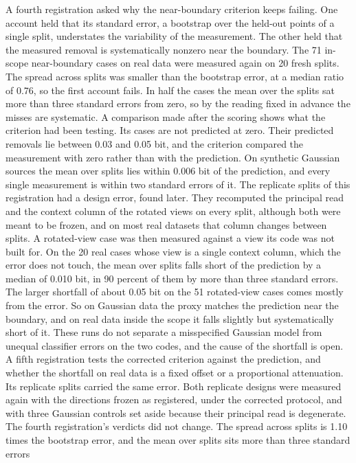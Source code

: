 \documentclass[11pt]{article}
\begin{document}
A fourth registration asked why the near-boundary criterion keeps
failing. One account held that its standard error, a bootstrap over the
held-out points of a single split, understates the variability of the
measurement. The other held that the measured removal is systematically
nonzero near the boundary. The 71 in-scope near-boundary cases on real
data were measured again on 20 fresh splits. The spread across splits
was smaller than the bootstrap error, at a median ratio of 0.76, so the
first account fails. In half the cases the mean over the splits sat more
than three standard errors from zero, so by the reading fixed in advance
the misses are systematic. A comparison made after the scoring shows
what the criterion had been testing. Its cases are not predicted at
zero. Their predicted removals lie between 0.03 and 0.05 bit, and the
criterion compared the measurement with zero rather than with the
prediction. On synthetic Gaussian sources the mean over splits lies
within 0.006 bit of the prediction, and every single measurement is
within two standard errors of it. The replicate splits of this
registration had a design error, found later. They recomputed the
principal read and the context column of the rotated views on every
split, although both were meant to be frozen, and on most real datasets
that column changes between splits. A rotated-view case was then
measured against a view its code was not built for. On the 20 real cases
whose view is a single context column, which the error does not touch,
the mean over splits falls short of the prediction by a median of 0.010
bit, in 90 percent of them by more than three standard errors. The
larger shortfall of about 0.05 bit on the 51 rotated-view cases comes
mostly from the error. So on Gaussian data the proxy matches the
prediction near the boundary, and on real data inside the scope it falls
slightly but systematically short of it. These runs do not separate a
misspecified Gaussian model from unequal classifier errors on the two
codes, and the cause of the shortfall is open. A fifth registration tests
the corrected criterion against the prediction, and whether the
shortfall on real data is a fixed offset or a proportional attenuation.
Its replicate splits carried the same error. Both replicate designs were
measured again with the directions frozen as registered, under the
corrected protocol, and with three Gaussian controls set aside because
their principal read is degenerate. The fourth registration's verdicts
did not change. The spread across splits is 1.10 times the bootstrap
error, and the mean over splits sits more than three standard errors
\end{document}
